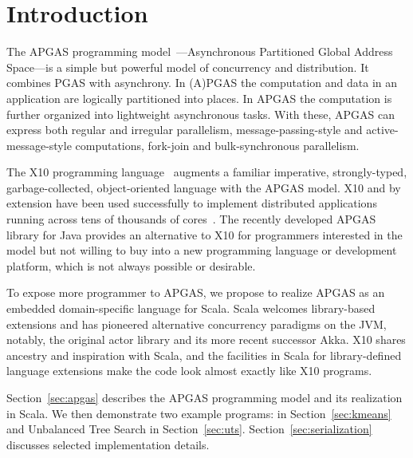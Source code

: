\section*{Introduction}

The APGAS programming model~\cite{amp10}---Asynchronous Partitioned Global Address Space---is a simple but powerful
model of concurrency and distribution. It combines PGAS with asynchrony.
In (A)PGAS the computation and data in an application are logically partitioned into places.
In APGAS the computation is further organized into lightweight asynchronous tasks.
With these, APGAS can express both
regular and irregular parallelism, message-passing-style and
active-message-style computations, fork-join and bulk-synchronous
parallelism. %

The X10 programming language~\cite{oopsla05} augments a familiar imperative, strongly-typed, garbage-collected, object-oriented language with the APGAS model.
X10 and by extension
\apgas have been used successfully to implement distributed applications
running across tens of thousands of cores~\cite{TardieuETAL14X10ApgasAtPetascale}.
The recently developed APGAS library for Java \cite{APGASJava} provides an alternative to X10 for programmers interested in the \apgas model but not willing to buy into a new programming language or development platform, which is not always possible or desirable.

To expose more programmer to APGAS, we propose to realize APGAS as an embedded domain-specific language for Scala. 
Scala welcomes library-based extensions and has pioneered alternative concurrency paradigms on the JVM,
notably, the original actor library \cite{HallerOdersky07ActorsThatUnifyThreadsEvents} and its more recent successor Akka.
X10 shares ancestry and inspiration with Scala, and the
facilities in Scala for library-defined language extensions make the code look
almost exactly like X10 programs.

Section~\ref{sec:apgas} describes the APGAS programming model and its realization in Scala. We then demonstrate two example programs: \kmeans in Section~\ref{sec:kmeans} and Unbalanced Tree Search in Section~\ref{sec:uts}. Section~\ref{sec:serialization} discusses selected implementation details.%



